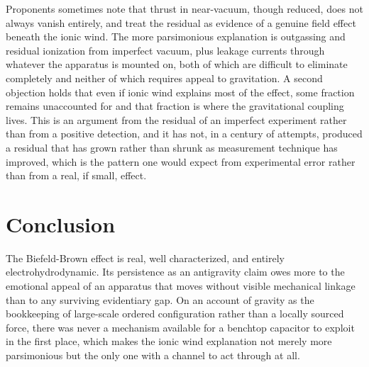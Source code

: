 \documentclass[11pt]{article}
\begin{document}
Proponents sometimes note that thrust in near-vacuum, though reduced, does not always vanish entirely, and treat the residual as evidence of a genuine field effect beneath the ionic wind. The more parsimonious explanation is outgassing and residual ionization from imperfect vacuum, plus leakage currents through whatever the apparatus is mounted on, both of which are difficult to eliminate completely and neither of which requires appeal to gravitation. A second objection holds that even if ionic wind explains most of the effect, some fraction remains unaccounted for and that fraction is where the gravitational coupling lives. This is an argument from the residual of an imperfect experiment rather than from a positive detection, and it has not, in a century of attempts, produced a residual that has grown rather than shrunk as measurement technique has improved, which is the pattern one would expect from experimental error rather than from a real, if small, effect.

\section{Conclusion}

The Biefeld-Brown effect is real, well characterized, and entirely electrohydrodynamic. Its persistence as an antigravity claim owes more to the emotional appeal of an apparatus that moves without visible mechanical linkage than to any surviving evidentiary gap. On an account of gravity as the bookkeeping of large-scale ordered configuration rather than a locally sourced force, there was never a mechanism available for a benchtop capacitor to exploit in the first place, which makes the ionic wind explanation not merely more parsimonious but the only one with a channel to act through at all.
\end{document}
